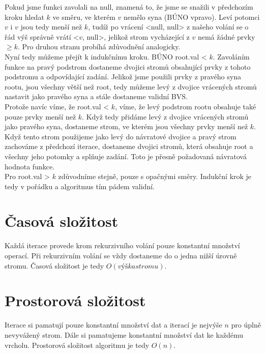 \documentclass[11pt,a4paper]{article}
\begin{document}
Pokud jsme funkci zavolali na null, znamená to, že jsme se snažili v předchozím kroku hledat $k$ ve směru, ve kterém $v$ nemělo syna (BÚNO vpravo). Leví potomci $v$ i $v$ jsou tedy menší než $k$, tudíž po vrácení <null, null> z našeho volání se o řád výš správně vrátí <$v$, null>, jelikož strom vycházející z $v$ nemá žádné prvky $\geq k$. Pro druhou stranu probíhá zdůvodnění analogicky.\\

Nyní tedy můžeme přejít k indukčnímu kroku. BÚNO root.val < $k$. Zavoláním funkce na pravý podstrom dostaneme dvojici stromů obsahující prvky z tohoto podstromu a odpovídající zadání. Jelikož jsme použili prvky z pravého syna rootu, jsou všechny větší než root, tedy můžeme levý z dvojice vrácených stromů nastavit jako pravého syna a stále dostaneme validní BVS. \\

Protože navíc víme, že root.val < $k$, víme, že levý podstrom rootu obsahuje také pouze prvky menší než $k$. Když tedy přidáme levý z dvojice vrácených stromů jako pravého syna, dostaneme strom, ve kterém jsou všechny prvky menší než $k$.\\

Když tento strom použijeme jako levý do návratové dvojice a pravý strom zachováme z předchozí iterace, dostaneme dvojici stromů, která obsahuje root a všechny jeho potomky a splňuje zadání. Toto je přesně požadovaná návratová hodnota funkce.\\

Pro root.val > $k$ zdůvodníme stejně, pouze s opačnými směry. Indukční krok je tedy v pořádku a algoritmus tím pádem validní.
\section{Časová složitost}
Každá iterace provede krom rekurzivního volání pouze konstantní množství operací. Při rekurzivním volání se vždy dostaneme do o jedna nižší úrovně stromu. Časová složitost je tedy $O(výška stromu)$.
\section{Prostorová složitost}
Iterace si pamatují pouze konstantní množství dat a iterací je nejvýše $n$ pro úplně nevyvážený strom. Dále si pamatujeme konstantní množství dat ke každému vrcholu. Prostorová složitost algoritmu je tedy $O(n)$.
\end{document}
